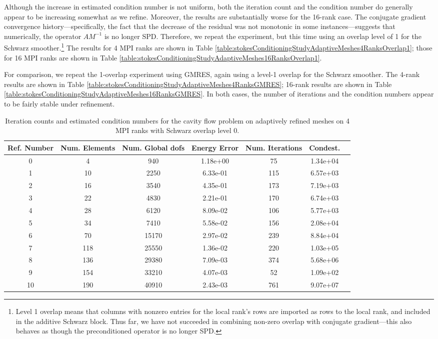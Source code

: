 \documentclass[11pt]{amsart}
\begin{document}
Although the increase in estimated condition number is not uniform, both the iteration count and the condition number do generally appear to be increasing somewhat as we refine.  Moreover, the results are substantially worse for the 16-rank case.  The conjugate gradient convergence history---specifically, the fact that the decrease of the residual was not monotonic in some instances---suggests that numerically, the operator $A M^{-1}$ is no longer SPD.  Therefore, we repeat the experiment, but this time using an overlap level of 1 for the Schwarz smoother.\footnote{Level 1 overlap means that columns with nonzero entries for the local rank's rows are imported as rows to the local rank, and included in the additive Schwarz block.  Thus far, we have not succeeded in combining non-zero overlap with conjugate gradient---this also behaves as though the preconditioned operator is no longer SPD.}  The results for 4 MPI ranks are shown in Table \ref{table:stokesConditioningStudyAdaptiveMeshes4RanksOverlap1}; those for 16 MPI ranks are shown in Table \ref{table:stokesConditioningStudyAdaptiveMeshes16RanksOverlap1}.

For comparison, we repeat the 1-overlap experiment using GMRES, again using a level-1 overlap for the Schwarz smoother.  The 4-rank results are shown in Table \ref{table:stokesConditioningStudyAdaptiveMeshes4RanksGMRES}; 16-rank results are shown in Table \ref{table:stokesConditioningStudyAdaptiveMeshes16RanksGMRES}.  In both cases, the number of iterations and the condition numbers appear to be fairly stable under refinement.

\begin{table}
\begin{tabular}{ c  c  c  c  c  c c}
Ref. Number	&Num. Elements	& Num. Global dofs		&Energy Error	&Num. Iterations	&Condest.\\
\hline
0	&4	&940	&1.18e+00	&   75	&1.34e+04\\
1	&10	&2250	&6.33e-01	&  115	&6.57e+03\\
2	&16	&3540	&4.35e-01	&  173	&7.19e+03\\
3	&22	&4830	&2.21e-01	&  170	&6.74e+03\\
4	&28	&6120	&8.09e-02	&  106	&5.77e+03\\
5	&34	&7410	&5.58e-02	&  156	&2.08e+04\\
6	&70	&15170	&2.97e-02	&  239	&8.84e+04\\
7	&118	&25550	&1.36e-02	&  220	&1.03e+05\\
8	&136	&29380	&7.09e-03	&  374	&5.68e+06\\
9	&154	&33210	&4.07e-03	&   52	&1.09e+02\\
10 	&190	&40910	&2.43e-03	&  761	&9.07e+07\\
\end{tabular}
\caption{Iteration counts and estimated condition numbers for the cavity flow problem on adaptively refined meshes on 4 MPI ranks with Schwarz overlap level 0.}
\label{table:stokesConditioningStudyAdaptiveMeshes4Ranks}
\end{table}
\end{document}
